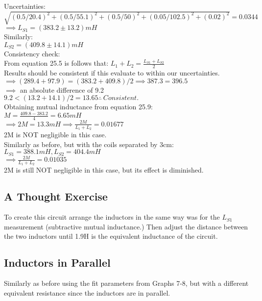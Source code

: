 \documentclass{article}
\begin{document}
Uncertainties:\\
$\sqrt{(0.5/20.4)^2+(0.5/55.1)^2+(0.5/50)^2+(0.05/102.5)^2+(0.02)^2}=0.0344$\\
$\implies L_{S1}=(383.2\pm13.2)mH$\\

Similarly:\\
$L_{S2}=(409.8\pm14.1)mH$\\

Consistency check:\\
From equation 25.5 is follows that:
$L_1+L_2=\frac{L_{S1}+L_{S2}}{2}$\\

Results should be consistent if this evaluate to within our uncertainties.
$\implies (289.4+97.9)=(383.2+409.8)/2\implies 387.3=396.5$\\ 
$\implies$ an absolute difference of 9.2\\
$9.2<(13.2+14.1)/2=13.65 \therefore\ Consistent.$\\

Obtaining mutual inductance from equation 25.9:\\
$M=\frac{409.8-383.2}{4}=6.65mH$\\
$\implies 2M = 13.3mH\implies \frac{2M}{L_1+L_2}=0.01677$\\

2M is NOT negligible in this case.\\

Similarly as before, but with the coils separated by 3cm:\\
$L_{S1}=388.1mH, L_{S2}=404.4mH$\\
$\implies \frac{2M}{L_1+L_2}=0.01035$\\

2M is still NOT negligible in this case, but its effect is diminished.
\subsection{A Thought Exercise}
To create this circuit arrange the inductors in the same way was for the $L_{S1}$ measurement (subtractive mutual inductance.) Then adjust the distance between the two inductors until 1.9H is the equivalent inductance of the circuit.
\subsection{Inductors in Parallel}
Similarly as before using the fit parameters from Graphs 7-8, but with a different equivalent resistance since the inductors are in parallel.\\
\end{document}
